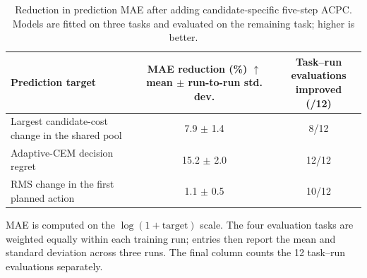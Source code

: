 \begin{table}[H]
\centering
\caption{Reduction in prediction MAE after adding candidate-specific five-step ACPC. Models are fitted on three tasks and evaluated on the remaining task; higher is better.}
\label{tab:acpc-planner-increment}
\scriptsize
\setlength{\tabcolsep}{4.5pt}
\begin{tabularx}{\linewidth}{Xcc}
\toprule
Prediction target & \shortstack{MAE reduction (\%) $\uparrow$\\mean $\pm$ run-to-run std. dev.} & \shortstack{Task--run evaluations\\improved (/12)} \\
\midrule
Largest candidate-cost change in the shared pool & 7.9 $\pm$ 1.4 & 8/12 \\
Adaptive-CEM decision regret & 15.2 $\pm$ 2.0 & 12/12 \\
RMS change in the first planned action & 1.1 $\pm$ 0.5 & 10/12 \\
\bottomrule
\end{tabularx}
\vspace{2pt}

\parbox{0.98\linewidth}{\scriptsize MAE is computed on the $\log(1+\mathrm{target})$ scale. The four evaluation tasks are weighted equally within each training run; entries then report the mean and standard deviation across three runs. The final column counts the 12 task--run evaluations separately.}
\end{table}
